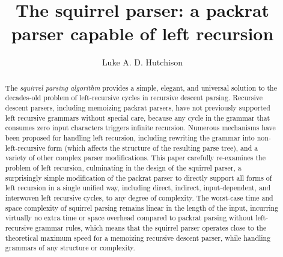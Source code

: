 \documentclass[manuscript]{acmart}
\begin{document}
\title[The Squirrel Parser]{The squirrel parser: a packrat parser capable of left recursion}

\author{Luke A. D. Hutchison}


\begin{abstract}
The \emph{squirrel parsing algorithm} provides a simple, elegant, and universal solution to the decades-old problem of left-recursive cycles in recursive descent parsing. Recursive descent parsers, including memoizing packrat parsers, have not previously supported left recursive grammars without special care, because any cycle in the grammar that consumes zero input characters triggers infinite recursion. Numerous mechanisms have been proposed for handling left recursion, including rewriting the grammar into non-left-recursive form (which affects the structure of the resulting parse tree), and a variety of other complex parser modifications. This paper carefully re-examines the problem of left recursion, culminating in the design of the squirrel parser, a surprisingly simple modification of the packrat parser to directly support all forms of left recursion in a single unified way, including direct, indirect, input-dependent, and interwoven left recursive cycles, to any degree of complexity. The worst-case time and space complexity of squirrel parsing remains linear in the length of the input, incurring virtually no extra time or space overhead compared to packrat parsing without left-recursive grammar rules, which means that the squirrel parser operates close to the theoretical maximum speed for a memoizing recursive descent parser, while handling grammars of any structure or complexity.
\end{abstract}
\end{document}
